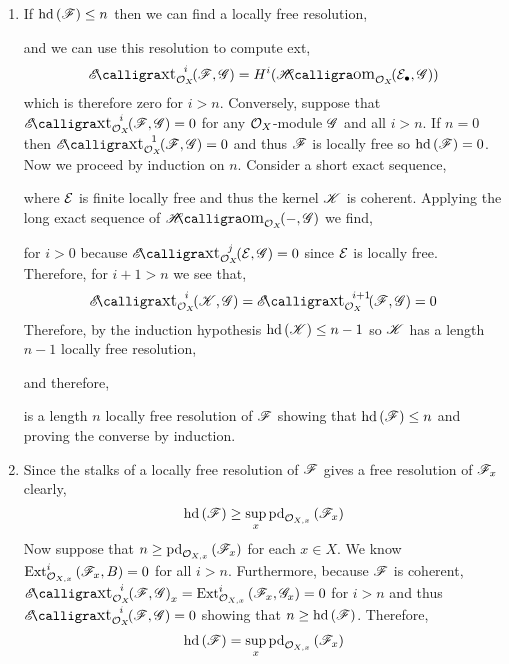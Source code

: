 \documentclass[12pt]{article}
\begin{document}
\begin{enumerate}
\item If $\mathrm{hd}\left( \mathscr{F} \right) \le n$ then we can find a locally free resolution,
\begin{center}
\end{center}
and we can use this resolution to compute ext,
\[ \shExt{i}{\struct{X}}{\F}{\G} = H^i(\shHom{\struct{X}}{\E_\bullet}{\G}) \]
which is therefore zero for $i > n$. Conversely, suppose that $\shExt{i}{\struct{X}}{\F}{\G} = 0$ for any $\mathcal{O}_{X}$-module $\mathscr{G}$ and all $i > n$. If $n = 0$ then $\shExt{1}{\struct{X}}{\F}{\G} = 0$ and thus $\mathscr{F}$ is locally free so $\mathrm{hd}\left( \mathscr{F} \right) = 0$. Now we proceed by induction on $n$. Consider a short exact sequence,
\begin{center}
\end{center}
where $\mathcal{E}$ is finite locally free and thus the kernel $\mathscr{K}$ is coherent. Applying the long exact sequence of $\shHom{\struct{X}}{-}{\G}$ we find,
\begin{center}
\end{center}
for $i > 0$ because $\shExt{j}{\struct{X}}{\E}{\G} = 0$ since $\mathcal{E}$ is locally free. Therefore, for $i + 1 > n$ we see that,
\[ \shExt{i}{\struct{X}}{\K}{\G} = \shExt{i+1}{\struct{X}}{\F}{\G} = 0 \]
Therefore, by the induction hypothesis $\mathrm{hd}\left( \mathscr{K} \right) \le n - 1$ so $\mathscr{K}$ has a length $n-1$ locally free resolution,
\begin{center}
\end{center}
and therefore,
\begin{center}
\end{center}
is a length $n$ locally free resolution of $\mathscr{F}$ showing that $\mathrm{hd}\left( \mathscr{F} \right) \le n$ and proving the converse by induction.

\item Since the stalks of a locally free resolution of $\mathscr{F}$ gives a free resolution of $\mathscr{F}_x$ clearly,
\[ \mathrm{hd}\left( \mathscr{F} \right) \ge \sup_x \mathrm{pd}_{\mathcal{O}_{X, x}}\left(\mathscr{F}_x \right) \]
Now suppose that $n \ge \mathrm{pd}_{\mathcal{O}_{X, x}}\left(\mathscr{F}_x \right)$ for each $x \in X$. We know $\mathrm{Ext}^{i}_{\mathcal{O}_{X, x}} \left( \mathscr{F}_x, B \right) = 0$ for all $i > n$. Furthermore, because $\mathscr{F}$ is coherent, $\shExt{i}{\struct{X}}{\F}{\G}_x = \Ext{i}{\stalk{X}{x}}{\F_x}{\G_x} = 0$ for $i > n$ and thus $\shExt{i}{\struct{X}}{\F}{\G} = 0$ showing that $n \ge \mathrm{hd}\left( \mathscr{F} \right)$. Therefore,
\[ \mathrm{hd}\left( \mathscr{F} \right) = \sup_x \mathrm{pd}_{\mathcal{O}_{X, x}}\left(\mathscr{F}_x \right) \]
\end{enumerate}
\end{document}
